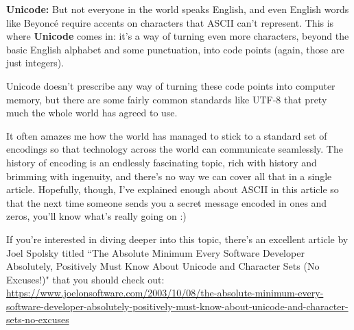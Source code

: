 \documentclass{article}
\begin{document}
\textbf{Unicode:} 
But not everyone in the world speaks English, and even English words like Beyoncé require accents on characters that ASCII can't represent. This is where \textbf{Unicode} comes in: it's a way of turning even more characters, beyond the basic English alphabet and some punctuation, into code points (again, those are just integers).

Unicode doesn't prescribe any way of turning these code points into computer memory, but there are some fairly common standards like UTF-8 that prety much the whole world has agreed to use.

It often amazes me how the world has managed to stick to a standard set of encodings so that technology across the world can communicate seamlessly. The history of encoding is an endlessly fascinating topic, rich with history and brimming with ingenuity, and there's no way we can cover all that in a single article. Hopefully, though, I've explained enough about ASCII in this article so that the next time someone sends you a secret message encoded in ones and zeros, you'll know what's really going on :)

If you're interested in diving deeper into this topic, there's an excellent article by Joel Spolsky titled ``The Absolute Minimum Every Software Developer Absolutely, Positively Must Know About Unicode and Character Sets (No Excuses!)" that you should check out: \url{https://www.joelonsoftware.com/2003/10/08/the-absolute-minimum-every-software-developer-absolutely-positively-must-know-about-unicode-and-character-sets-no-excuses}
\end{document}
